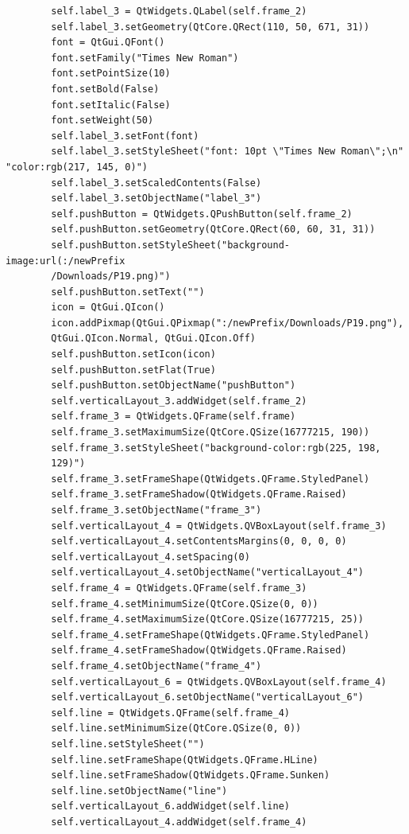 \documentclass[12pt]{article}
\begin{document}
\begin{verbatim}
        self.label_3 = QtWidgets.QLabel(self.frame_2)
        self.label_3.setGeometry(QtCore.QRect(110, 50, 671, 31))
        font = QtGui.QFont()
        font.setFamily("Times New Roman")
        font.setPointSize(10)
        font.setBold(False)
        font.setItalic(False)
        font.setWeight(50)
        self.label_3.setFont(font)
        self.label_3.setStyleSheet("font: 10pt \"Times New Roman\";\n"
"color:rgb(217, 145, 0)")
        self.label_3.setScaledContents(False)
        self.label_3.setObjectName("label_3")
        self.pushButton = QtWidgets.QPushButton(self.frame_2)
        self.pushButton.setGeometry(QtCore.QRect(60, 60, 31, 31))
        self.pushButton.setStyleSheet("background-image:url(:/newPrefix
        /Downloads/P19.png)")
        self.pushButton.setText("")
        icon = QtGui.QIcon()
        icon.addPixmap(QtGui.QPixmap(":/newPrefix/Downloads/P19.png"),
        QtGui.QIcon.Normal, QtGui.QIcon.Off)
        self.pushButton.setIcon(icon)
        self.pushButton.setFlat(True)
        self.pushButton.setObjectName("pushButton")
        self.verticalLayout_3.addWidget(self.frame_2)
        self.frame_3 = QtWidgets.QFrame(self.frame)
        self.frame_3.setMaximumSize(QtCore.QSize(16777215, 190))
        self.frame_3.setStyleSheet("background-color:rgb(225, 198,
        129)")
        self.frame_3.setFrameShape(QtWidgets.QFrame.StyledPanel)
        self.frame_3.setFrameShadow(QtWidgets.QFrame.Raised)
        self.frame_3.setObjectName("frame_3")
        self.verticalLayout_4 = QtWidgets.QVBoxLayout(self.frame_3)
        self.verticalLayout_4.setContentsMargins(0, 0, 0, 0)
        self.verticalLayout_4.setSpacing(0)
        self.verticalLayout_4.setObjectName("verticalLayout_4")
        self.frame_4 = QtWidgets.QFrame(self.frame_3)
        self.frame_4.setMinimumSize(QtCore.QSize(0, 0))
        self.frame_4.setMaximumSize(QtCore.QSize(16777215, 25))
        self.frame_4.setFrameShape(QtWidgets.QFrame.StyledPanel)
        self.frame_4.setFrameShadow(QtWidgets.QFrame.Raised)
        self.frame_4.setObjectName("frame_4")
        self.verticalLayout_6 = QtWidgets.QVBoxLayout(self.frame_4)
        self.verticalLayout_6.setObjectName("verticalLayout_6")
        self.line = QtWidgets.QFrame(self.frame_4)
        self.line.setMinimumSize(QtCore.QSize(0, 0))
        self.line.setStyleSheet("")
        self.line.setFrameShape(QtWidgets.QFrame.HLine)
        self.line.setFrameShadow(QtWidgets.QFrame.Sunken)
        self.line.setObjectName("line")
        self.verticalLayout_6.addWidget(self.line)
        self.verticalLayout_4.addWidget(self.frame_4)

\end{verbatim}
\end{document}
